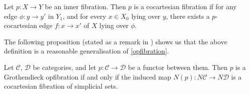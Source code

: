 \documentclass{MetricNotes2023}
\begin{document}
\begin{definition}
Let \(p : X \to Y\) be an inner fibration. Then \(p\) is a cocartesian fibration if for any edge \(\phi : y \to y'\) in \(Y_1\), and for every \(x \in X_0\) lying over \(y\), there exists a \(p\)-cocartesian edge \(f : x \to x'\) of \(X\) lying over \(\phi\). 
\end{definition}

The following proposition (stated as a remark in \autocite{lurie2008higher}) shows us that the above definition is a reasonable generalisation of \ref{opfibration}. 

\begin{proposition}\label{prop:opiffco}
Let \(\mathcal{C}\), \(\mathcal{D}\) be categories, and let \(p : \mathcal{C} \to \mathcal{D}\) be a functor between them. Then \(p\) is a Grothendieck opfibration if and only if the induced map \(N(p) : N \mathcal{C} \to N\mathcal{D}\) is a cocartesian fibration of simplicial sets.
\end{proposition}
\end{document}

